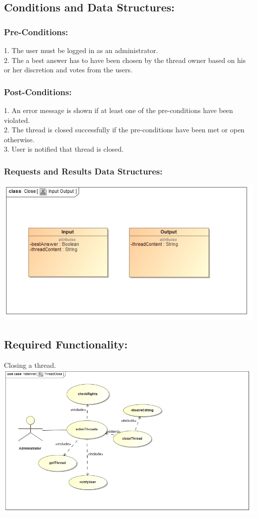 \documentclass[a4paper,11pt]{article}
\begin{document}
\subsection{Conditions and Data Structures:}
\subsubsection*{Pre-Conditions:}
1.	The user must be logged in as an administrator.\\
2.	The a best answer has to have been chosen by the thread owner based on his or her discretion and votes from the users.\\
\subsubsection*{Post-Conditions:}
1.	An error message is shown if at least one of the pre-conditions have been violated.\\
2.	The thread is closed successfully if the pre-conditions have been met or open otherwise.\\
3.	User is notified that thread is closed.\\
\subsubsection*{Requests and Results Data Structures:}
\includegraphics{Images/SCHMThread/CloseInOut.jpg}\\
\subsection{Required Functionality:} 
Closing a thread.\\
\includegraphics[width=1\linewidth]{./Images/SCHMThread/ThreadClose.jpg}\\
\end{document}
